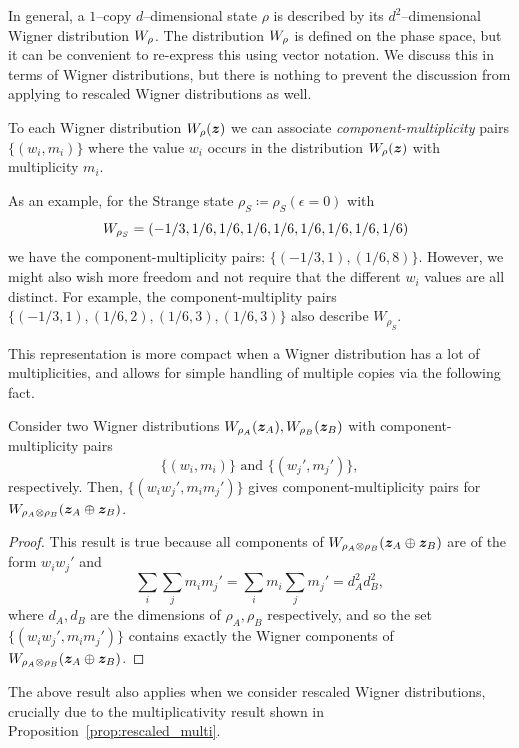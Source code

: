 \documentclass[pra,
aps,
twocolumn,
superscriptaddress,
groupedaddress,
nofootinbib,
reprint
]{revtex4-1}
\begin{document}
In general, a $1$--copy $d$--dimensional state $\rho$ is described by its $d^2$--dimensional Wigner distribution $\W{\rho}$. 
The distribution $\W{\rho}$ is defined on the phase space, but it can be convenient to re-express this using vector notation.
We discuss this in terms of Wigner distributions, but there is nothing to prevent the discussion from applying to rescaled Wigner distributions as well.

To each Wigner distribution $W_\rho(\bm{z})$ we can associate \emph{component-multiplicity} pairs $\{(w_i, m_i)\}$ where the value $w_i$ occurs in the distribution $W_\rho(\bm{z})$ with multiplicity $m_i$.

As an example, for the Strange state $\rho_S \coloneqq \rho_S(\epsilon=0)$ with
\begin{equation}
\hspace{-5pt} W_{\rho_S} = (-1/3, 1/6,  1/6,  1/6,  1/6,  1/6,  1/6,  1/6,  1/6)
\end{equation}
we have the component-multiplicity pairs: $\{( -1/3, 1), ( 1/6, 8)\}$. However, we might also wish more freedom and not require that the different $w_i$ values are all distinct. For example, the component-multiplity pairs $\{(-1/3, 1), (1/6, 2), (1/6, 3), (1/6, 3)\}$ also describe $W_{\rho_S}$.

This representation is more compact when a Wigner distribution has a lot of multiplicities, and allows for simple handling of multiple copies via the following fact.
\begin{proposition}
Consider two Wigner distributions $\W{\rho_A}(\bmz_A), \W{\rho_B}(\bmz_B)$ with component-multiplicity pairs 
\begin{equation}
	\{(w_i, m_i)\} \text{ and } \{(w_j', m_j')\},
\end{equation}
respectively. Then, $\{(w_i w_j', m_i m_j')\}$ gives component-multiplicity pairs for $\W{\rho_A \otimes \rho_B}(\bmz_A \oplus \bmz_B)$.
\end{proposition}
\begin{proof}
	This result is true because all components of $\W{\rho_A \otimes \rho_B}(\bmz_A \oplus \bmz_B)$ are of the form $w_i w_j'$ and 
\begin{equation*}
	\sum_{i}\sum_{j} m_i m_j' = \sum_{i} m_i \sum_{j} m_j' = d_A^2 d_B^2,
\end{equation*}
where $d_A, d_B$ are the dimensions of $\rho_A, \rho_B$ respectively, and
so the set $\{(w_i w_j', m_i m_j')\}$ contains exactly the Wigner components of $\W{\rho_A \otimes \rho_B}(\bmz_A \oplus \bmz_B)$.
\end{proof}
The above result also applies when we consider rescaled Wigner distributions, crucially due to the multiplicativity result shown in Proposition~\ref{prop:rescaled_multi}.
\end{document}
